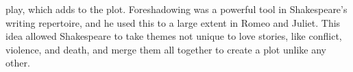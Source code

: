 \documentclass[12pt]{report}
\begin{document}
play, which adds to the plot. Foreshadowing was a powerful tool in Shakespeare's writing repertoire, and he used this to a large extent in Romeo and Juliet. This idea allowed Shakespeare to take themes not unique to love stories, like conflict, violence, and death, and merge them all together to create a plot unlike any other.
\end{document}
